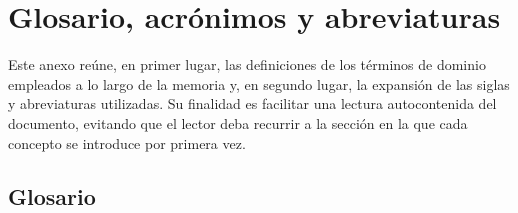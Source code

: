 
\chapter{Glosario, acrónimos y abreviaturas}

Este anexo reúne, en primer lugar, las definiciones de los términos de dominio
empleados a lo largo de la memoria y, en segundo lugar, la expansión de las
siglas y abreviaturas utilizadas. Su finalidad es facilitar una lectura
autocontenida del documento, evitando que el lector deba recurrir a la sección
en la que cada concepto se introduce por primera vez.

\section{Glosario}

